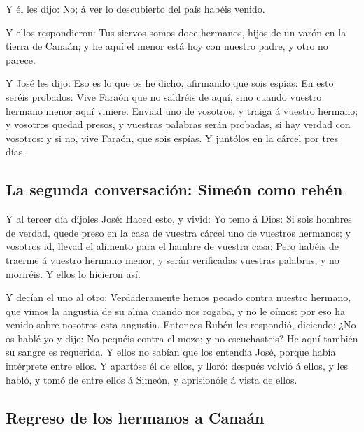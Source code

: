  Y él les dijo: No; á ver lo descubierto del país habéis
venido.

 Y ellos respondieron: Tus siervos somos doce hermanos,
hijos de un varón en la tierra de Canaán; y he aquí el menor está hoy
con nuestro padre, y otro no parece.

 Y José les dijo: Eso es lo que os he dicho, afirmando que
sois espías:  En esto seréis probados: Vive Faraón que no
saldréis de aquí, sino cuando vuestro hermano menor aquí viniere.
 Enviad uno de vosotros, y traiga á vuestro hermano; y
vosotros quedad presos, y vuestras palabras serán probadas, si hay
verdad con vosotros: y si no, vive Faraón, que sois espías.
 Y juntólos en la cárcel por tres días.

\hypertarget{la-segunda-conversaciuxf3n-simeuxf3n-como-rehuxe9n}{%
\subsection{La segunda conversación: Simeón como
rehén}\label{la-segunda-conversaciuxf3n-simeuxf3n-como-rehuxe9n}}

 Y al tercer día díjoles José: Haced esto, y vivid: Yo temo
á Dios:  Si sois hombres de verdad, quede preso en la casa
de vuestra cárcel uno de vuestros hermanos; y vosotros id, llevad el
alimento para el hambre de vuestra casa:  Pero habéis de
traerme á vuestro hermano menor, y serán verificadas vuestras palabras,
y no moriréis. Y ellos lo hicieron así.

 Y decían el uno al otro: Verdaderamente hemos pecado
contra nuestro hermano, que vimos la angustia de su alma cuando nos
rogaba, y no le oímos: por eso ha venido sobre nosotros esta angustia.
 Entonces Rubén les respondió, diciendo: ¿No os hablé yo y
dije: No pequéis contra el mozo; y no escuchasteis? He aquí también su
sangre es requerida.  Y ellos no sabían que los entendía
José, porque había intérprete entre ellos.  Y apartóse él
de ellos, y lloró: después volvió á ellos, y les habló, y tomó de entre
ellos á Simeón, y aprisionóle á vista de ellos.

\hypertarget{regreso-de-los-hermanos-a-canauxe1n}{%
\subsection{Regreso de los hermanos a
Canaán}\label{regreso-de-los-hermanos-a-canauxe1n}}

